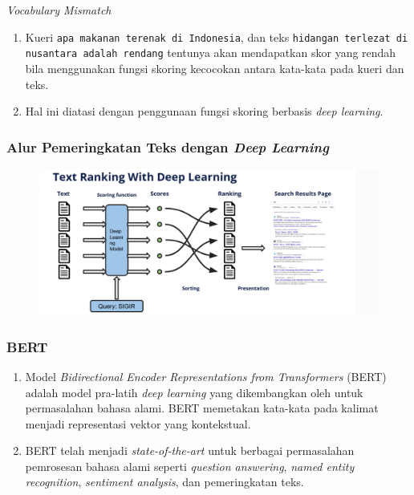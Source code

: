 \documentclass[10pt]{beamer}
\newcommand{\f}[1]{\textit{#1}}
\newcommand{\code}[1]{\texttt{#1}}
\begin{document}
\begin{frame}{\f{Vocabulary Mismatch}}
    \begin{enumerate}
        \item Kueri \code{apa makanan terenak di Indonesia}, dan teks \code{hidangan terlezat di nusantara adalah rendang} tentunya akan mendapatkan skor yang rendah bila menggunakan fungsi skoring kecocokan antara kata-kata pada kueri dan teks.
        \item Hal ini diatasi dengan penggunaan fungsi skoring berbasis \f{deep learning}.
    \end{enumerate}
\end{frame}

\begin{frame}
    \frametitle{Alur Pemeringkatan Teks dengan \f{Deep Learning}}
    \begin{figure}
        \centering
        \includegraphics[width=1\textwidth]{assets/pics/DL-IR.png}
    \end{figure}
\end{frame}

\begin{frame}
    \frametitle{BERT}
    \begin{enumerate}
        \item Model \f{Bidirectional Encoder Representations from Transformers} (BERT) adalah model pra-latih \f{deep learning} yang dikembangkan oleh \cite{bertori} untuk permasalahan bahasa alami. BERT memetakan kata-kata pada kalimat menjadi representasi vektor yang kontekstual.
        \item BERT telah menjadi \f{state-of-the-art} untuk berbagai permasalahan pemrosesan bahasa alami seperti \f{question answering}, \f{named entity recognition}, \f{sentiment analysis}, dan pemeringkatan teks.
    \end{enumerate}
\end{frame}
\end{document}
